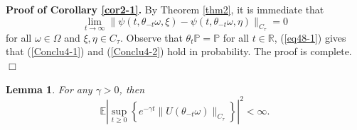 \documentclass[preprint,12pt]{elsarticle}
\newtheorem{lemma}{Lemma}[section]
\begin{document}
\noindent
{\bf Proof of Corollary \ref{cor2-1}.} By Theorem \ref{thm2}, it is immediate that \begin{equation}\label{eq48-1}\lim_{t\rightarrow\infty}\|\psi(t,\theta_{-t}\omega,\xi)-\psi(t,\theta_{-t}\omega,\eta)\|_{C_\tau}=0
\end{equation}
for all $\omega\in\Omega$ and $\xi,\eta\in C_\tau$. Observe that $\theta_t\mathbb{P}=\mathbb{P}$ for all $t\in\mathbb{R}$, (\ref{eq48-1}) gives that (\ref{Conclu4-1}) and (\ref{Conclu4-2}) hold in probability. The proof is complete.\quad\quad$\Box$

\begin{lemma}\label{lem5}
For any $\gamma>0$, then
\begin{equation}\label{eq49}
\mathbb{E}\left|\sup_{t\geq0}\left\{e^{-\gamma t}\|U(\theta_{-t}\omega)\|_{C_\tau}\right\}\right|^2<\infty.
\end{equation}
\end{lemma}
\end{document}
